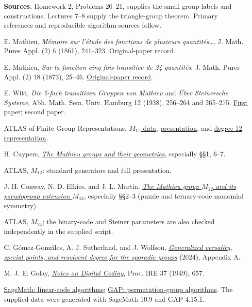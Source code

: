 \documentclass[12pt,letterpaper]{article}
\theoremstyle{definition}
\theoremstyle{remark}
\begin{document}
\textbf{Sources.} Homework 2, Problems 20--21, supplies the small-group labels and constructions. Lectures 7--8 supply the triangle-group theorem. Primary references and reproducible algorithm sources follow.
\begin{enumerate}[label={[\arabic*]},leftmargin=*,itemsep=1pt]
\footnotesize
\item E. Mathieu, \emph{M\'emoire sur l'\'etude des fonctions de plusieurs quantit\'es\ldots}, J. Math. Pures Appl. (2) 6 (1861), 241--323. \href{https://www.numdam.org/item/JMPA_1861_2_6__241_0/}{Original-paper record}.
\item E. Mathieu, \emph{Sur la fonction cinq fois transitive de 24 quantit\'es}, J. Math. Pures Appl. (2) 18 (1873), 25--46. \href{https://www.numdam.org/item/JMPA_1873_2_18__25_0/}{Original-paper record}.
\item E. Witt, \emph{Die 5-fach transitiven Gruppen von Mathieu} and \emph{\"Uber Steinersche Systeme}, Abh. Math. Sem. Univ. Hamburg 12 (1938), 256--264 and 265--275. \href{https://doi.org/10.1007/BF02948947}{First paper}; \href{https://doi.org/10.1007/BF02948948}{second paper}.
\item ATLAS of Finite Group Representations, \href{https://brauer.maths.qmul.ac.uk/Atlas/v3/spor/M11/}{$M_{11}$ data}, \href{https://brauer.maths.qmul.ac.uk/Atlas/v3/pres/M11G1-P1}{presentation}, and \href{https://brauer.maths.qmul.ac.uk/Atlas/v3/permrep/M11G1-p12B0}{degree-12 representation}.
\item H. Cuypers, \href{https://www.win.tue.nl/~hansc/mathieu.pdf}{\emph{The Mathieu groups and their geometries}}, especially §§1, 6--7.
\item ATLAS, \href{https://brauer.maths.qmul.ac.uk/Atlas/spor/M12/}{$M_{12}$}: standard generators and full presentation.
\item J. H. Conway, N. D. Elkies, and J. L. Martin, \href{https://arxiv.org/abs/math/0508630}{\emph{The Mathieu group $M_{12}$ and its pseudogroup extension $M_{13}$}}, especially §§2--3 (puzzle and ternary-code monomial symmetry).
\item ATLAS, \href{https://brauer.maths.qmul.ac.uk/Atlas/spor/M24/}{$M_{24}$}; the binary-code and Steiner parameters are also checked independently in the supplied script.
\item C. G\'omez-Gonz\'ales, A. J. Sutherland, and J. Wolfson, \href{https://arxiv.org/abs/2310.09375}{\emph{Generalized versality, special points, and resolvent degree for the sporadic groups}} (2024), Appendix A.
\item M. J. E. Golay, \href{https://pierre-hyvernat.apps.math.cnrs.fr/data/Enseignement/2223/info602/TP-Golay/golay_paper.pdf}{\emph{Notes on Digital Coding}}, Proc. IRE 37 (1949), 657.
\item \href{https://doc.sagemath.org/html/en/reference/coding/sage/coding/linear_code.html}{SageMath: linear-code algorithms}; \href{https://docs.gap-system.org/doc/ref/chap43.html}{GAP: permutation-group algorithms}. The supplied data were generated with SageMath 10.9 and GAP 4.15.1.
\end{enumerate}
\end{document}
